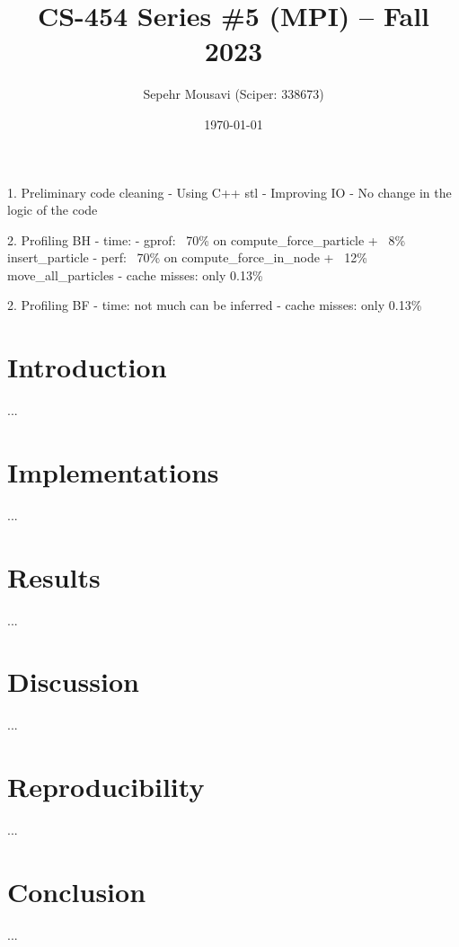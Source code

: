 \documentclass[10pt,journal,compsocconf]{IEEEtran}
\title{CS-454 Series \#5 (MPI) -- Fall 2023}
\author{
  Sepehr Mousavi (Sciper: 338673)
}
\date{\today}
\begin{document}
\maketitle


1. Preliminary code cleaning
  - Using C++ stl
  - Improving IO
  - No change in the logic of the code

2. Profiling BH
  - time:
    - gprof: ~70\% on compute_force_particle + ~8\% insert_particle
    - perf: ~70\% on compute_force_in_node + ~12\% move_all_particles
  - cache misses: only 0.13\%
    
2. Profiling BF
  - time: not much can be inferred
  - cache misses: only 0.13\%


\section{Introduction}
...

\section{Implementations}
...

\section{Results}
...

\section{Discussion}
...

\section{Reproducibility}
...

\section{Conclusion}
...
\end{document}
